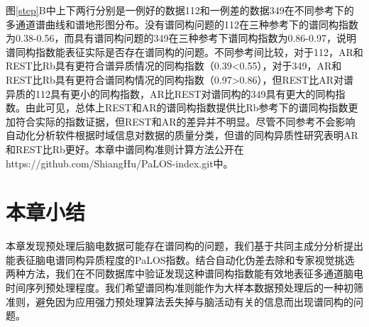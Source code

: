 图\ref{step}B中上下两行分别是一例好的数据112和一例差的数据349在不同参考下的多通道谱曲线和谱地形图分布。没有谱同构问题的112在三种参考下的谱同构指数为0.38-0.56，而具有谱同构问题的349在三种参考下谱同构指数为0.86-0.97，说明谱同构指数能表征实际是否存在谱同构的问题。不同参考间比较，对于112，AR和REST比Rb具有更符合谱异质情况的同构指数（0.39<0.55），对于349，AR和REST比Rb具有更符合谱同构情况的同构指数（0.97>0.86），但REST比AR对谱异质的112具有更小的同构指数，AR比REST对谱同构的349具有更大的同构指数。由此可见，总体上REST和AR的谱同构指数提供比Rb参考下的谱同构指数更加符合实际的指数证据，但REST和AR的差异并不明显。尽管不同参考不会影响自动化分析软件根据时域信息对数据的质量分类，但谱的同构异质性研究表明AR和REST比Rb更好。本章中谱同构准则计算方法公开在https://github.com/ShiangHu/PaLOS-index.git中。

\section{本章小结}
本章发现预处理后脑电数据可能存在谱同构的问题，我们基于共同主成分分析提出能表征脑电谱同构异质程度的PaLOS指数。结合自动化伪差去除和专家视觉挑选两种方法，我们在不同数据库中验证发现这种谱同构指数能有效地表征多通道脑电时间序列预处理程度。我们希望谱同构准则能作为大样本数据预处理后的一种初筛准则，避免因为应用强力预处理算法丢失掉与脑活动有关的信息而出现谱同构的问题。